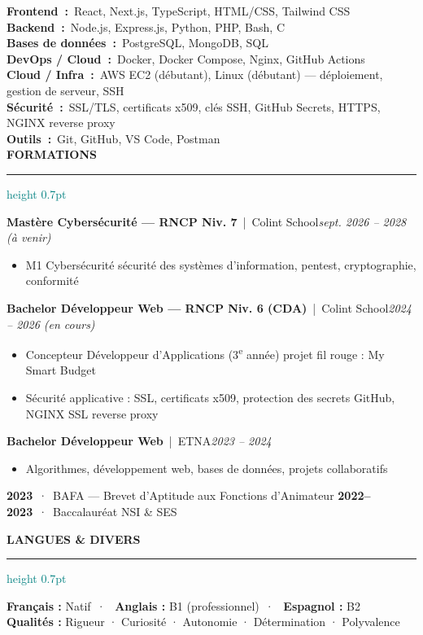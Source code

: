 \documentclass[a4paper,9.5pt]{article}
\newcommand{\cvsection}[1]{%
  \vspace{2pt}%
  {\color{navy}\textbf{\uppercase{#1}}}%
  \vspace{1pt}%
  \textcolor{teal}{\hrule height 0.7pt}%
  \vspace{2pt}%
}
\newcommand{\cventry}[4]{%
  \vspace{2pt}%
  {\color{navy}\textbf{#1}}~{\color{gray}|~#2}\hfill{\color{gray}\textit{\footnotesize #3}}\\[-3pt]
  #4%
}
\newcommand{\cvbullet}[1]{%
  \begin{itemize}[leftmargin=1em, itemsep=0pt, topsep=0pt, parsep=0pt]
    \item[\textcolor{teal}{\footnotesize--}] {\small #1}
  \end{itemize}%
}
\newcommand{\skillrow}[2]{%
  \vspace{1pt}%
  {\color{navy}\textbf{#1~:}}~{\small #2}\\%
}
\begin{document}
\skillrow{Frontend}{React, Next.js, TypeScript, HTML/CSS, Tailwind CSS}
\skillrow{Backend}{Node.js, Express.js, Python, PHP, Bash, C}
\skillrow{Bases de données}{PostgreSQL, MongoDB, SQL}
\skillrow{DevOps / Cloud}{Docker, Docker Compose, Nginx, GitHub Actions}
\skillrow{Cloud / Infra}{AWS EC2 (débutant), Linux (débutant) --- déploiement, gestion de serveur, SSH}
\skillrow{Sécurité}{SSL/TLS, certificats x509, clés SSH, GitHub Secrets, HTTPS, NGINX reverse proxy}
\skillrow{Outils}{Git, GitHub, VS Code, Postman}

\cvsection{Formations}

\cventry{Mastère Cybersécurité --- RNCP Niv. 7}{Colint School}{sept. 2026 -- 2028 (à venir)}{%
  \cvbullet{M1 Cybersécurité  sécurité des systèmes d'information, pentest, cryptographie, conformité}
}

\cventry{Bachelor Développeur Web --- RNCP Niv. 6 (CDA)}{Colint School}{2024 -- 2026 (en cours)}{%
  \cvbullet{Concepteur Développeur d'Applications (3\textsuperscript{e} année)  projet fil rouge : My Smart Budget}
  \cvbullet{Sécurité applicative : SSL, certificats x509, protection des secrets GitHub, NGINX SSL reverse proxy}
}

\cventry{Bachelor Développeur Web}{ETNA}{2023 -- 2024}{%
  \cvbullet{Algorithmes, développement web, bases de données, projets collaboratifs}
}

\vspace{2pt}
{\color{navy}\textbf{2023}}~·~BAFA --- Brevet d'Aptitude aux Fonctions d'Animateur\hspace{1em}%
{\color{navy}\textbf{2022--2023}}~·~Baccalauréat NSI \& SES

\cvsection{Langues \& Divers}

\vspace{1pt}
{\color{navy}\textbf{Français :}} Natif~·~%
{\color{navy}\textbf{Anglais :}} B1 (professionnel)~·~%
{\color{navy}\textbf{Espagnol :}} B2\\[3pt]
{\color{navy}\textbf{Qualités :}} Rigueur · Curiosité · Autonomie · Détermination · Polyvalence
\end{document}
